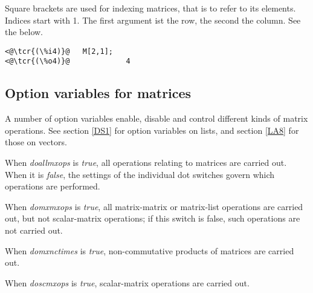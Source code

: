 \documentclass[../Maxima_Workbook.tex]{subfiles}
\begin{document}
Square brackets are used for indexing matrices, that is to refer to its elements. Indices start with 1. The first argument ist the row, the second the column. See the  below.

\lz \begin{small} \color{blue}
\begin{lstlisting}
<@\tcr{(\%i4)}@   M[2,1];
<@\tcr{(\%o4)}@				4
\end{lstlisting}
\color{black} \end{small}

\subsection{Option variables for matrices}\label{LA7}

A number of option variables enable, disable and control different kinds of matrix operations. See section \ref{DS1} for option variables on lists, and section \ref{LA8} for those on vectors.

\lzz {} \qquad {} \hfill {}

\lz When \emph{doallmxops} is \emph{true}, all operations relating to matrices are carried out. When it is \emph{false}, the settings of the individual dot switches govern which operations are performed.

\lzz {} \qquad {} \hfill {}

\lz When \emph{domxmxops} is \emph{true}, all matrix-matrix or matrix-list operations are carried out, but not scalar-matrix operations; if this switch is false, such operations are not carried out.

\lzz {} \qquad {} \hfill {}

\lz When \emph{domxnctimes} is \emph{true}, non-commutative products of matrices are carried out.

\lzz {} \qquad {} \hfill {}

\lz When \emph{doscmxops} is \emph{true}, scalar-matrix operations are carried out.

\lzz {} \qquad {} \hfill {}
\end{document}
